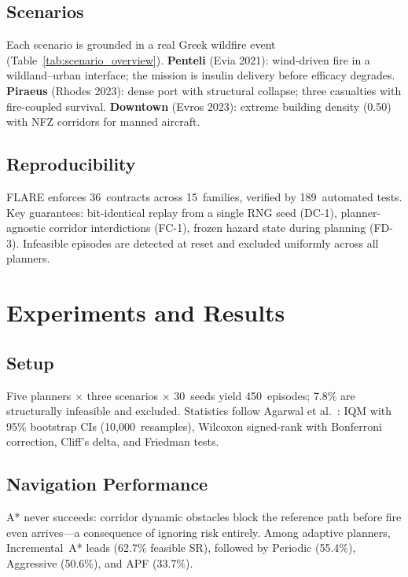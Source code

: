 \documentclass[conference]{IEEEtran}
\begin{document}
\subsection{Scenarios}\label{sec:scenarios}

Each scenario is grounded in a real Greek wildfire event
(Table~\ref{tab:scenario_overview}).
\textbf{Penteli} (Evia 2021): wind-driven fire in a wildland--urban
interface; the mission is insulin delivery before efficacy degrades.
\textbf{Piraeus} (Rhodes 2023): dense port with structural collapse;
three casualties with fire-coupled survival.
\textbf{Downtown} (Evros 2023): extreme building density (0.50) with
NFZ corridors for manned aircraft.



\subsection{Reproducibility}

FLARE enforces 36~contracts across 15~families, verified by 189~automated
tests. Key guarantees: bit-identical replay from a single RNG seed (DC-1),
planner-agnostic corridor interdictions (FC-1), frozen hazard state during
planning (FD-3). Infeasible episodes are detected at reset and excluded
uniformly across all planners.

\section{Experiments and Results}\label{sec:results}

\subsection{Setup}

Five planners $\times$ three scenarios $\times$ 30~seeds yield
450~episodes; 7.8\% are structurally infeasible and excluded. Statistics
follow Agarwal et al.~\cite{Agarwal2021}: IQM with 95\% bootstrap CIs
(10{,}000~resamples), Wilcoxon signed-rank with Bonferroni correction,
Cliff's delta, and Friedman tests.

\subsection{Navigation Performance}

A* never succeeds: corridor dynamic obstacles block the reference path before fire
even arrives---a consequence of ignoring risk entirely.
Among adaptive planners, Incremental~A* leads (62.7\% feasible SR),
followed by Periodic (55.4\%), Aggressive (50.6\%), and APF (33.7\%).
\end{document}
